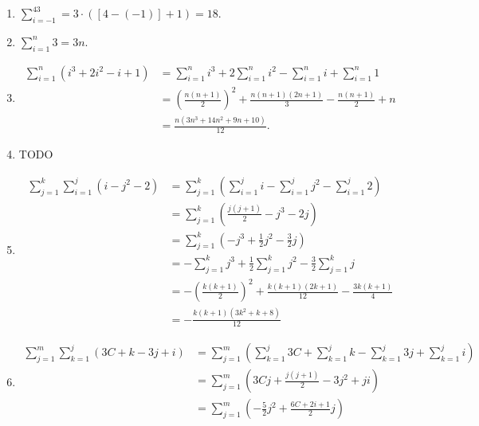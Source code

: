 \documentclass[9pt]{article}
\newcommand{\D}{\displaystyle}
\begin{document}
\begin{enumerate}
      \begin{enumerate}
         \item $\D\sum_{i=-1}^43 = 3 \cdot ([4 - (-1)] + 1) = 18$.
         \item $\D\sum_{i=1}^n3 = 3n$.
         \item \begin{align*}
                  \sum_{i=1}^n (i^3 + 2i^2 - i + 1) &= \sum_{i=1}^n i^3 +
                     2\sum_{i=1}^ni^2 - \sum_{i=1}^ni + \sum_{i=1}^n1 \\
                  &= \left(\frac{n(n+1)}{2}\right)^2 + \frac{n(n+1)(2n+1)}{3} -
                     \frac{n(n+1)}{2} + n \\
                  &= \frac{n(3n^3 + 14n^2 + 9n + 10)}{12}.
               \end{align*}
         \item TODO
         \item \begin{align*}
                  \sum_{j=1}^k\sum_{i=1}^j (i - j^2 - 2) &=
                     \sum_{j=1}^k\left(\sum_{i=1}^ji - \sum_{i=1}^jj^2 -
                     \sum_{i=1}^j2\right) \\
                     &= \sum_{j=1}^k\left(\frac{j(j+1)}{2} - j^3 -2j\right) \\
                     &= \sum_{j=1}^k\left(-j^3 + \frac{1}{2}j^2 -
                           \frac{3}{2}j \right) \\
                     &= -\sum_{j=1}^kj^3 + \frac{1}{2}\sum_{j=1}^kj^2 -
                           \frac{3}{2}\sum_{j=1}^kj \\
                     &= -\left(\frac{k(k+1)}{2}\right)^2 +
                           \frac{k(k+1)(2k+1)}{12} - \frac{3k(k+1)}{4} \\
                     &= -\frac{k(k + 1)(3k^2 + k + 8)}{12}
               \end{align*}
         \item \begin{align*}
                  \sum_{j=1}^m\sum_{k=1}^j (3C + k - 3j + i) &=
                     \sum_{j=1}^m\left(\sum_{k=1}^j3C + \sum_{k=1}^jk -
                     \sum_{k=1}^j3j + \sum_{k=1}^ji\right) \\
                     &= \sum_{j=1}^m\left(3Cj + \frac{j(j+1)}{2} - 3j^2 +
                           ji\right) \\
                     &= \sum_{j=1}^m\left(-\frac{5}{2}j^2 +
                        \frac{6C+2i+1}{2}j\right) \\

\end{align*}
\end{enumerate}
\end{enumerate}
\end{document}
